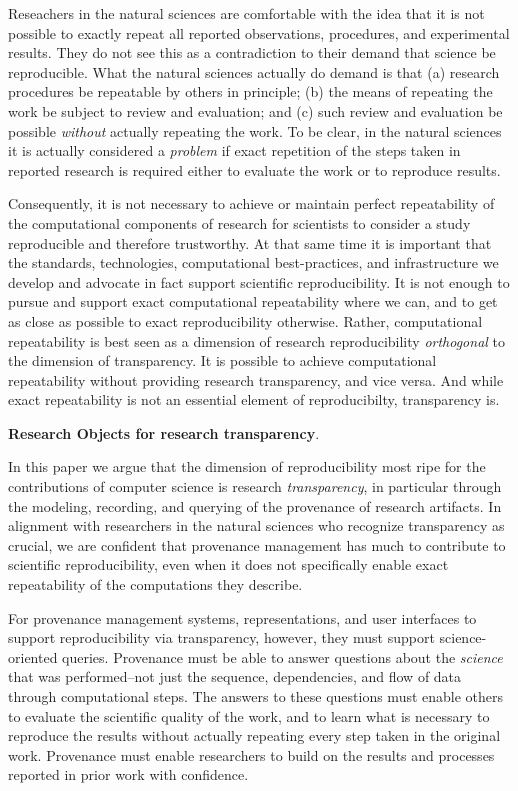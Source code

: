  Reseachers in the natural sciences are comfortable with the idea that it is not possible to exactly
	repeat all reported observations, procedures, and experimental results.
They do not see this as a contradiction to their demand that science be reproducible.
What the natural sciences actually do demand is that 
	(a) research procedures be repeatable by others in principle;
	(b) the means of repeating the work be subject to review and evaluation; 
	and (c) such review and evaluation be possible \emph{without} actually repeating the work.
To be clear, in the natural sciences it is actually considered a \emph{problem} if exact repetition of the steps
	taken in reported research is required either to evaluate the work or to reproduce results.

Consequently, it is not necessary to achieve or 
	maintain perfect repeatability of the computational components of research for scientists to 
	consider a study reproducible and therefore trustworthy.
At that same time it is important that the standards, technologies, 
	computational best-practices, and infrastructure we develop and advocate in fact support scientific reproducibility.
It is not enough to pursue and support exact computational repeatability where we can, and to get as close
	as possible to exact reproducibility otherwise.
Rather, computational repeatability is best seen as a dimension of research reproducibility \emph{orthogonal} to 
	the dimension of transparency.
It is possible to achieve computational repeatability without providing research transparency, and vice versa.
And while exact repeatability is not an essential element of reproducibilty, transparency is.

\textbf{Research Objects for research transparency}.

In this paper we argue that the dimension of reproducibility most ripe for the contributions of computer science 
	is research \emph{transparency}, in particular through the modeling, recording, and querying of the provenance of research artifacts.
In alignment with researchers in the natural sciences who recognize transparency as crucial,
	we are confident that provenance management has much to contribute to scientific reproducibility,
	 even when it does not specifically enable exact repeatability of the computations they describe.

For provenance management systems, representations, and user interfaces to support reproducibility via transparency,
	however, they must support science-oriented queries.
Provenance must be able to answer questions about the \emph{science} that was performed--not just the 
	sequence, dependencies, and flow of data through computational steps.
The answers to these questions must enable others to evaluate the scientific quality of the work, and to learn what is necessary to 
	reproduce the results without actually repeating every step taken in the original work.
Provenance must enable researchers to build on the results and processes reported in prior work with confidence.

